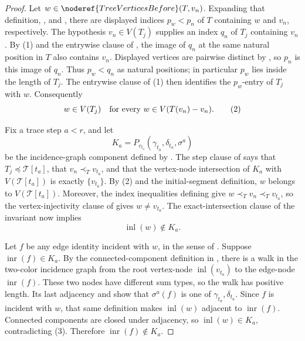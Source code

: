 \begin{proof}
Let \(w\in\noderef{TreeVerticesBefore}(T,v_n)\).  Expanding that
definition, , and
, there are displayed indices \(p_w<p_n\)
of \(T\) containing \(w\) and \(v_n\), respectively.  The hypothesis
\(v_n\in V(T_j)\) supplies an index \(q_n\) of \(T_j\) containing \(v_n\).
By (1) and the entrywise clause of
, the image of \(q_n\) at the same
natural position in \(T\) also contains \(v_n\).  Displayed vertices are
pairwise distinct by , so \(p_n\) is this image of
\(q_n\).  Thus \(p_w<q_n\) as natural positions; in particular \(p_w\)
lies inside the length of \(T_j\).  The entrywise clause of (1) then
identifies the \(p_w\)-entry of \(T_j\) with \(w\).  Consequently
\[
        w\in V(T_j)\quad\hbox{for every }w\in V(T(v_n)-v_n).   \tag{2}
\]

Fix a trace step \(a<r\), and let
\[
 K_a=P_{v_{t_a}}(\gamma_{t_a},\delta_{t_a},\sigma^a)
\]
be the incidence-graph component defined by
.  The step clause of
 says that
\(T_j\preceq\mathcal T[t_a]\), that \(v_n\prec_Tv_{t_a}\), and that the
vertex-node intersection of \(K_a\) with
\(V(\mathcal T[t_a])\) is exactly \(\{v_{t_a}\}\).  By (2) and the
initial-segment definition, \(w\) belongs to
\(V(\mathcal T[t_a])\).  Moreover, the index inequalities defining
 give
\(w\prec_Tv_n\prec_Tv_{t_a}\), so the vertex-injectivity clause of
 gives \(w\ne v_{t_a}\).  The exact-intersection
clause of the invariant now implies
\[
                         \operatorname{inl}(w)\notin K_a.      \tag{3}
\]

Let \(f\) be any edge identity incident with \(w\), in the sense of
.  Suppose \(\operatorname{inr}(f)\in K_a\).  By the
connected-component definition in , there is
a walk in the two-color incidence graph from the root vertex-node
\(\operatorname{inl}(v_{t_a})\) to the edge-node
\(\operatorname{inr}(f)\).  These two nodes have different sum types, so
the walk has positive length.  Its last adjacency and
 show that
\(\sigma^a(f)\) is one of \(\gamma_{t_a},\delta_{t_a}\).  Since \(f\) is
incident with \(w\), that same definition makes
\(\operatorname{inl}(w)\) adjacent to \(\operatorname{inr}(f)\).
Connected components are closed under adjacency, so
\(\operatorname{inl}(w)\in K_a\), contradicting (3).  Therefore
\(\operatorname{inr}(f)\notin K_a\).


\end{proof}
